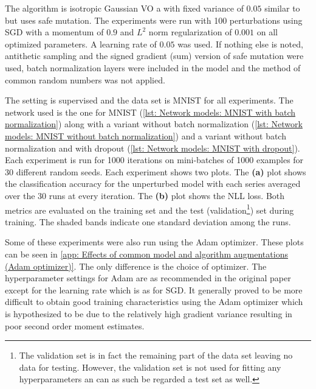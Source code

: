 The algorithm is isotropic Gaussian \gls{VO} a with fixed variance of $0.05$ similar to \cite{Salimans2017} but uses safe mutation.
The experiments were run with 100 perturbations using \gls{SGD} with a momentum of $0.9$ and $L^2$ norm regularization of $0.001$ on all optimized parameters. A learning rate of $0.05$ was used. If nothing else is noted, antithetic sampling and the signed gradient (sum) version of safe mutation were used, batch normalization layers were included in the model and the method of common random numbers was not applied.

The setting is supervised and the data set is \gls{MNIST} for all experiments. The network used is the one for \gls{MNIST} (\autoref{lst: Network models: MNIST with batch normalization}) along with a variant without batch normalization (\autoref{lst: Network models: MNIST without batch normalization}) and a variant without batch normalization and with dropout (\autoref{lst: Network models: MNIST with dropout}).
Each experiment is run for 1000 iterations on mini-batches of 1000 examples for 30 different random seeds. Each experiment shows two plots. The \textbf{(a)} plot shows the classification accuracy for the unperturbed model with each series averaged over the 30 runs at every iteration. The \textbf{(b)} plot shows the \gls{NLL} loss. Both metrics are evaluated on the training set and the test (validation\footnote{The validation set is in fact the remaining part of the data set leaving no data for testing. However, the validation set is not used for fitting any hyperparameters an can as such be regarded a test set as well.}) set during training. The shaded bands indicate one standard deviation among the runs.

Some of these experiments were also run using the Adam optimizer. These plots can be seen in \autoref{app: Effects of common model and algorithm augmentations (Adam optimizer)}. The only difference is the choice of optimizer. The hyperparameter settings for Adam are as recommended in the original paper except for the learning rate which is as for \gls{SGD}. It generally proved to be more difficult to obtain good training characteristics using the Adam optimizer which is hypothesized to be due to the relatively high gradient variance resulting in poor second order moment estimates.


